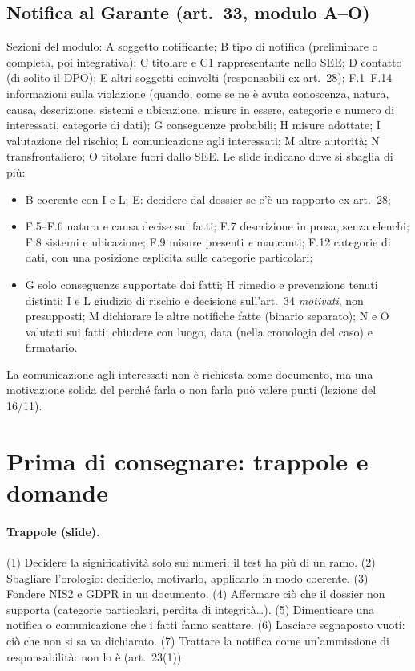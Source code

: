\subsection{Notifica al Garante (art.~33, modulo A--O)}
Sezioni del modulo: A soggetto notificante; B tipo di notifica (preliminare o completa, poi
integrativa); C titolare e C1 rappresentante nello SEE; D contatto (di solito il DPO); E altri soggetti
coinvolti (responsabili ex art.~28); F.1--F.14 informazioni sulla violazione (quando, come se ne è
avuta conoscenza, natura, causa, descrizione, sistemi e ubicazione, misure in essere, categorie e numero
di interessati, categorie di dati); G conseguenze probabili; H misure adottate; I valutazione del
rischio; L comunicazione agli interessati; M altre autorità; N transfrontaliero; O titolare fuori dallo
SEE. Le slide indicano dove si sbaglia di più:
\begin{itemize}
  \item B coerente con I e L; E: decidere dal dossier se c'è un rapporto ex art.~28;
  \item F.5--F.6 natura e causa decise sui fatti; F.7 descrizione in prosa, senza elenchi; F.8 sistemi e
    ubicazione; F.9 misure presenti \emph{e} mancanti; F.12 categorie di dati, con una posizione
    esplicita sulle categorie particolari;
  \item G solo conseguenze supportate dai fatti; H rimedio e prevenzione tenuti distinti; I e L giudizio
    di rischio e decisione sull'art.~34 \emph{motivati}, non presupposti; M dichiarare le altre
    notifiche fatte (binario separato); N e O valutati sui fatti; chiudere con luogo, data (nella
    cronologia del caso) e firmatario.
\end{itemize}
La comunicazione agli interessati non è richiesta come documento, ma una motivazione solida del perché
farla o non farla può valere punti (lezione del 16/11).

\section{Prima di consegnare: trappole e domande}

\paragraph{Trappole (slide).} (1) Decidere la significatività solo sui numeri: il test ha più di un
ramo. (2) Sbagliare l'orologio: deciderlo, motivarlo, applicarlo in modo coerente. (3) Fondere NIS2 e
GDPR in un documento. (4) Affermare ciò che il dossier non supporta (categorie particolari, perdita di
integrità\ldots). (5) Dimenticare una notifica o comunicazione che i fatti fanno scattare. (6) Lasciare
segnaposto vuoti: ciò che non si sa va dichiarato. (7) Trattare la notifica come un'ammissione di
responsabilità: non lo è (art.~23(1)).

